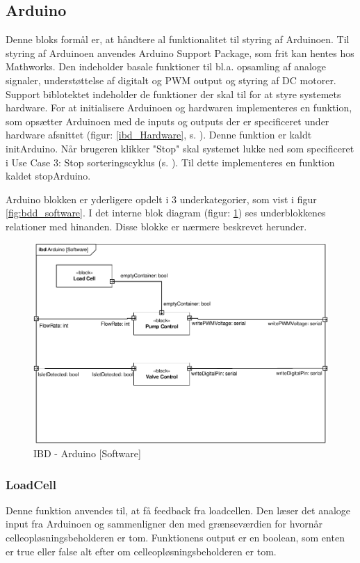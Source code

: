 \subsection{Arduino}
Denne bloks formål er, at håndtere al funktionalitet til styring af Arduinoen. Til styring af Arduinoen anvendes Arduino Support Package, som frit kan hentes hos Mathworks. Den indeholder basale funktioner til bl.a. opsamling af analoge signaler, understøttelse af digitalt og PWM output og styring af DC motorer. Support biblotektet indeholder de funktioner der skal til for at styre systemets hardware.
For at initialisere Arduinoen og hardwaren implementeres en funktion, som opsætter Arduinoen med de inputs og outputs der er specificeret under hardware afsnittet (figur: \ref{ibd_Hardware}, s. \pageref{fig:ibd_Hardware}). Denne funktion er kaldt initArduino. Når brugeren klikker "Stop" skal systemet lukke ned som specificeret i Use Case 3: Stop sorteringscyklus (s. \pageref{uc:3}). Til dette implementeres en funktion kaldet stopArduino. 

\newpage

Arduino blokken er yderligere opdelt i 3 underkategorier, som vist i figur \ref{fig:bdd_software}. I det interne blok diagram (figur: \ref{fig:ibd_software_arduino}) ses underblokkenes relationer med hinanden. Disse blokke er nærmere beskrevet herunder.  
\begin{figure}[H]
	\centering
	\includegraphics[width=1\textwidth]{billeder/IBD_Software_Arduino-crop.pdf}
	\caption{IBD - Arduino [Software]}
	\label{fig:ibd_software_arduino}
\end{figure}
\subsubsection{LoadCell}
Denne funktion anvendes til, at få feedback fra loadcellen. Den læser det analoge input fra Arduinoen og sammenligner den med grænseværdien for hvornår celleopløsningsbeholderen er tom. Funktionens output er en boolean, som enten er true eller false alt efter om celleopløsningsbeholderen er tom.
